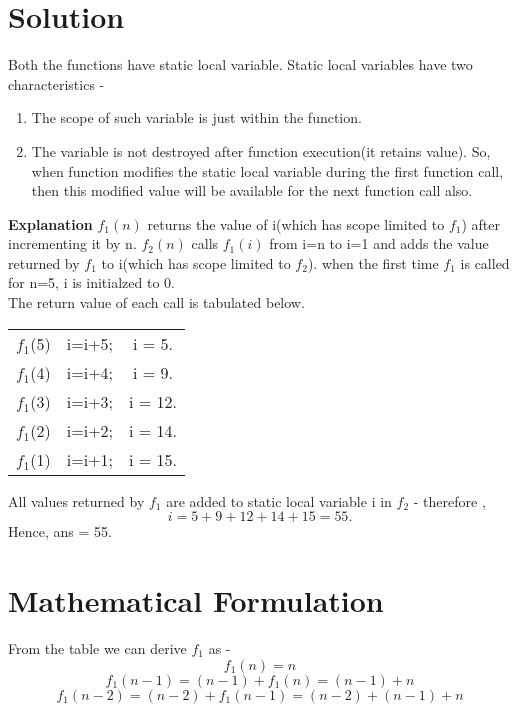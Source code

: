 \documentclass[journal,12pt,twocolumn]{IEEEtran}
\begin{document}
\section{Solution}
Both the functions have static local variable. Static local variables have two characteristics  - 
\begin{enumerate}
    \item The scope of such variable is just within the function.
    \item The variable is not destroyed after function execution(it retains value). So, when function modifies the static local variable during the first function call, then this modified value will be available for the next function call also.
\end{enumerate}
\textbf{Explanation}
$f_1(n)$ returns the value of i(which has scope limited to $f_1$) after incrementing it by n.
\newline
$f_2(n)$ calls $f_1(i)$ from i=n to i=1 and adds the value returned by $f_1$ to i(which has scope limited to $f_2$).
\newline
when the first time $f_1$ is called for n=5, i is initialzed to 0. \\
The return value of each call is tabulated below.
\begin{center}
\begin{tabular}{ |c|c|c| } 
 \hline
$f_1$(5)  & i=i+5; & i = 5. \\
$f_1$(4)  & i=i+4; & i = 9. \\
$f_1$(3)  & i=i+3; & i = 12. \\
$f_1$(2)  & i=i+2; & i = 14. \\
$f_1$(1)  & i=i+1; & i = 15. \\
 \hline
\end{tabular}
\end{center}
All values returned by $f_1$ are added to static local variable i in $f_2$ - 
\newline
therefore ,
\newline
\begin{equation*}
i = 5+9+12+14+15 = 55.
\end{equation*}
Hence, ans = 55.

\section{Mathematical Formulation}
From the table we can derive $f_1$ as -
\begin{equation}
f_1(n) = n 
\end{equation}
\begin{equation}
f_1(n-1) = (n-1) + f_1(n) = (n-1) + n 
\end{equation}
\begin{equation}
f_1(n-2) = (n-2) + f_1(n-1) = (n-2) + (n-1) + n
\end{equation}
\end{document}

